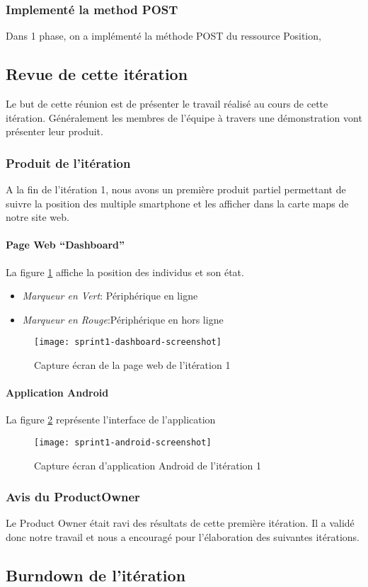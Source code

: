 
\subsubsection{Implementé la method POST}

Dans 1\ier{} phase, on a implémenté la méthode POST du ressource Position,


\subsection{Revue de cette itération}

Le but de cette réunion est de présenter le travail réalisé au cours de cette itération.
Généralement les membres de l’équipe à travers une démonstration vont présenter leur produit.

\subsubsection{Produit de l'itération}

A la fin de l’itération 1, nous avons un première produit partiel permettant de 
suivre la position des multiple smartphone et les afficher dans la carte
maps de notre site web.

\paragraph{Page Web ``Dashboard''}

La figure \ref{fig:sprint1-dashboard-screenshot} affiche la position des individus et son état.
\begin{itemize}
 \item \textit{Marqueur en Vert}: Périphérique en ligne  
 \item \textit{Marqueur en Rouge}:Périphérique en hors ligne 
\end{itemize}

\begin{figure}[htbp]
  \centering
  \texttt{[image: sprint1-dashboard-screenshot]}
  \caption{Capture écran de la page web de l'itération 1}
  \label{fig:sprint1-dashboard-screenshot}
\end{figure}

\paragraph{Application Android}
La figure \ref{fig:sprint1-android-screenshot} représente l'interface de l'application 
\begin{figure}[htbp]
  \centering
  \texttt{[image: sprint1-android-screenshot]}
  \caption{Capture écran d'application Android de l'itération 1}
  \label{fig:sprint1-android-screenshot}
\end{figure}

\subsubsection{Avis du ProductOwner}
Le Product Owner était ravi des résultats de cette première itération. Il a validé donc notre
travail et nous a encouragé pour l’élaboration des suivantes itérations.
\subsection{Burndown de l'itération}